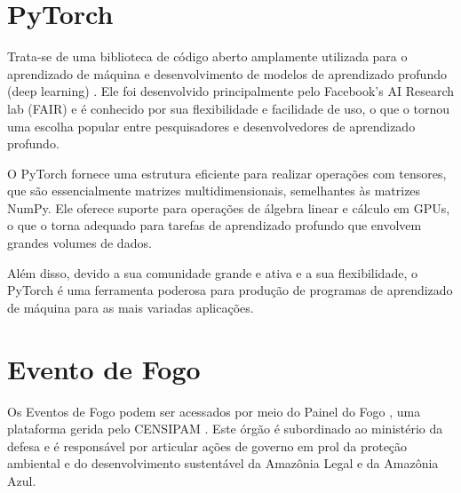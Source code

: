 

\section{PyTorch}

Trata-se de uma biblioteca de código aberto amplamente utilizada para o aprendizado de máquina e desenvolvimento de modelos de aprendizado profundo (deep learning) \cite{NEURIPS2019_9015}. Ele foi desenvolvido principalmente pelo Facebook's AI Research lab (FAIR) e é conhecido por sua flexibilidade e facilidade de uso, o que o tornou uma escolha popular entre pesquisadores e desenvolvedores de aprendizado profundo.

O PyTorch fornece uma estrutura eficiente para realizar operações com tensores, que são essencialmente matrizes multidimensionais, semelhantes às matrizes NumPy. Ele oferece suporte para operações de álgebra linear e cálculo em GPUs, o que o torna adequado para tarefas de aprendizado profundo que envolvem grandes volumes de dados.

Além disso, devido a sua comunidade grande e ativa e a sua flexibilidade, o PyTorch é uma ferramenta poderosa para produção de programas de aprendizado de máquina para as mais variadas aplicações.

\section{Evento de Fogo}

Os Eventos de Fogo podem ser acessados por meio do Painel do Fogo \cite{painel-fogo}, uma plataforma gerida pelo CENSIPAM \cite{censipam}. Este órgão é subordinado ao ministério da defesa e é responsável por articular ações de governo em prol da proteção ambiental e do desenvolvimento sustentável da Amazônia Legal e da Amazônia Azul.


